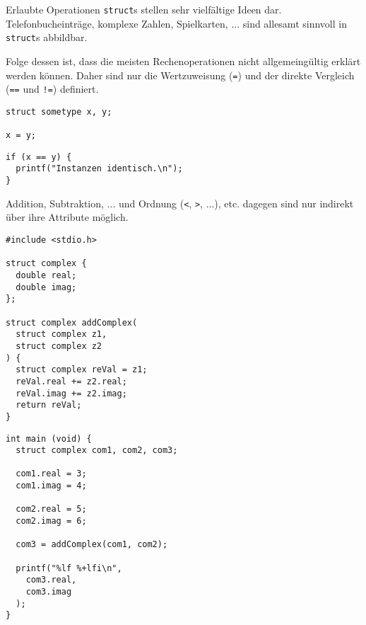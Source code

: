 \begin{frame}[fragile]{Erlaubte Operationen}
%
\texttt{struct}s stellen sehr vielfältige Ideen dar. Telefonbucheinträge, komplexe Zahlen, Spielkarten, ... sind allesamt sinnvoll in \texttt{struct}s abbildbar.

\vspace{3pt}
Folge dessen ist, dass die meisten Rechenoperationen nicht allgemeingültig erklärt werden können. Daher sind nur die Wertzuweisung (\texttt{=}) und der direkte Vergleich (\texttt{==} und \texttt{!=}) definiert.

\begin{tcbraster}[raster columns=2,
                  raster equal height,
                  nobeforeafter
                 ]
\begin{codebox}[Wertzuweisung]
\begin{verbatim}
struct sometype x, y;

x = y;
\end{verbatim}
\end{codebox}
%
\begin{codebox}[Vergleich]
\begin{verbatim}
if (x == y) {
  printf("Instanzen identisch.\n");
}
\end{verbatim}
\end{codebox}
\end{tcbraster}

Addition, Subtraktion, ... und Ordnung (\texttt{<}, \texttt{>}, ...), etc. dagegen sind nur indirekt über ihre Attribute möglich.
%
\end{frame}


\begin{frame}[fragile]
%
%
\begin{codebox}
\begin{verbatim}
#include <stdio.h>

struct complex {
  double real;
  double imag;
};

struct complex addComplex(
  struct complex z1, 
  struct complex z2
) {
  struct complex reVal = z1;
  reVal.real += z2.real;
  reVal.imag += z2.imag;
  return reVal;
}

\end{verbatim}
\end{codebox}
%
\begin{codebox}[... Fortsetzung]
\begin{verbatim}
int main (void) {
  struct complex com1, com2, com3;
  
  com1.real = 3;
  com1.imag = 4;
  
  com2.real = 5;
  com2.imag = 6;
  
  com3 = addComplex(com1, com2);
  
  printf("%lf %+lfi\n", 
    com3.real, 
    com3.imag
  );
}
\end{verbatim}
\end{codebox}
%
\end{frame}

